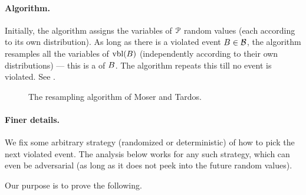 \paragraph*{Algorithm.}
Initially, the algorithm assigns the variables of $\EuScript{P}$ random
values (each according to its own distribution). As long as there is
a violated event ${B} \in \mathcal{B}$, the algorithm resamples all
the variables of $\vblX{\BEvent}$ (independently according to their
own distributions) --- this is a
 of ${B}$. The algorithm
repeats this till no event is violated. See .

\begin{figure}[h]
    \centerline{%
    }
    \caption{The resampling algorithm of Moser and Tardos.}
\end{figure}

\paragraph*{Finer details.}
We fix some arbitrary strategy (randomized or deterministic) of how to
pick the next violated event. The analysis below works for any such
strategy, which can even be adversarial (as long as it does not peek
into the future random values).

\bigskip

Our purpose is to prove the following.

